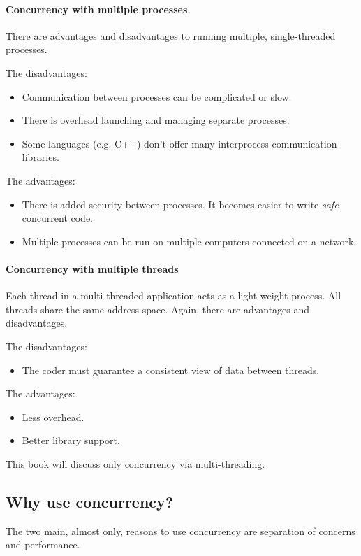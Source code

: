 \paragraph{Concurrency with multiple processes}
There are advantages and disadvantages to running multiple, single-threaded processes. 

The disadvantages:
\begin{itemize}
  \item Communication between processes can be complicated or slow.
  \item There is overhead launching and managing separate processes.
  \item Some languages (e.g. C++) don't offer many interprocess communication libraries.
\end{itemize}

The advantages:
\begin{itemize}
  \item There is added security between processes. It becomes easier to write \emph{safe} concurrent code.
  \item Multiple processes can be run on multiple computers connected on a network.
\end{itemize}

\paragraph{Concurrency with multiple threads}
Each thread in a multi-threaded application acts as a light-weight process. All threads share the same address space. Again, there are advantages and disadvantages. 

The disadvantages:
\begin{itemize}
  \item The coder must guarantee a consistent view of data between threads.
\end{itemize}

The advantages:
\begin{itemize}
  \item Less overhead.
  \item Better library support.
\end{itemize}

This book will discuss only concurrency via multi-threading.

\subsection{Why use concurrency?}
The two main, almost only, reasons to use concurrency are separation of concerns and performance.

